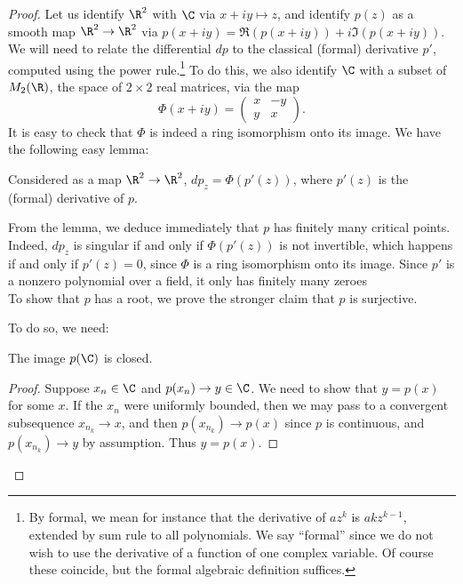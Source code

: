 \documentclass[12pt]{article}
\begin{document}
\begin{proof}Let us identify $\R^2$ with $\C$ via $x+iy \mapsto z$, and identify $p(z)$ as a smooth map $\R^2 \to \R^2$ via $p(x+iy) = \Re(p(x+iy)) + i\Im(p(x+iy))$. We will need to relate the differential $dp$ to the classical (formal) derivative $p'$, computed using the power rule.\footnote{By formal, we mean for instance that the derivative of $az^k$ is $akz^{k-1}$, extended by sum rule to all polynomials. We say ``formal'' since we do not wish to use the derivative of a function of one complex variable. Of course these coincide, but the formal algebraic definition suffices.} To do this, we also identify $\C$ with a subset of $M_2(\R)$, the space of $2\times 2$ real matrices, via the map
\[\Phi(x+iy) = \begin{pmatrix} x & -y\\
y & x\end{pmatrix}.\] It is easy to check that $\Phi$ is indeed a ring isomorphism onto its image. We have the following easy lemma:
\begin{lem}Considered as a map $\R^2 \to \R^2$, $dp_z = \Phi(p'(z))$, where $p'(z)$ is the (formal) derivative of $p$.\end{lem}
From the lemma, we deduce immediately that $p$ has finitely many critical points. Indeed, $dp_z$ is singular if and only if $\Phi(p'(z))$ is not invertible, which happens if and only if $p'(z) = 0$, since $\Phi$ is a ring isomorphism onto its image. Since $p'$ is a nonzero polynomial over a field, it only has finitely many zeroes\\[2ex]

To show that $p$ has a root, we prove the stronger claim that $p$ is surjective.

To do so, we need:
\begin{lem}The image $p(\C)$ is closed.\end{lem}
\begin{proof}Suppose $x_n \in \C$ and $p(x_n) \to y \in \C$. We need to show that $y = p(x)$ for some $x$. If the $x_n$ were uniformly bounded, then we may pass to a convergent subsequence $x_{n_k} \to x$, and then $p(x_{n_k}) \to p(x)$ since $p$ is continuous, and $p(x_{n_k}) \to y$ by assumption. Thus $y = p(x)$.


\end{proof}
\end{proof}
\end{document}

